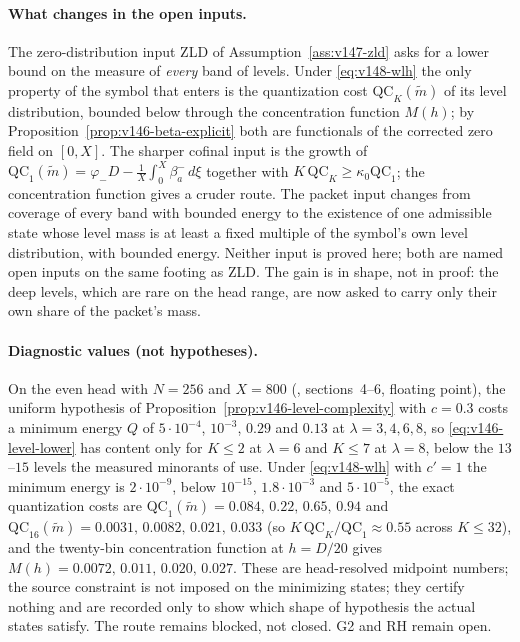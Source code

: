 \paragraph{What changes in the open inputs.}
The zero-distribution input ZLD of Assumption~\ref{ass:v147-zld} asks for
a lower bound on the measure of \emph{every} band of levels. Under
\eqref{eq:v148-wlh} the only property of the symbol that enters is the
quantization cost $\mathrm{QC}_K(\widetilde m)$ of its level distribution,
bounded below through the concentration function $M(h)$; by
Proposition~\ref{prop:v146-beta-explicit} both are functionals of the
corrected zero field on $[0,X]$. The sharper cofinal input is the growth
of $\mathrm{QC}_1(\widetilde m)=\varphi_-D-\frac1X\int_0^X\beta_a^-\,d\xi$
together with $K\,\mathrm{QC}_K\ge\kappa_0\mathrm{QC}_1$; the concentration
function gives a cruder route. The packet input changes from coverage of
every band with bounded energy to the existence of one admissible state
whose level mass is at least a fixed multiple of the symbol's own level
distribution, with bounded energy. Neither input is proved here; both are
named open inputs on the same footing as ZLD. The gain is in shape, not in
proof: the deep levels, which are rare on the head range, are now asked to
carry only their own share of the packet's mass.

\paragraph{Diagnostic values (not hypotheses).}
On the even head with $N=256$ and $X=800$
(, sections~4--6, floating point),
the uniform hypothesis of Proposition~\ref{prop:v146-level-complexity} with
$c=0.3$ costs a minimum energy $Q$ of $5\cdot10^{-4}$, $10^{-3}$, $0.29$
and $0.13$ at $\lambda=3,4,6,8$, so \eqref{eq:v146-level-lower} has content
only for $K\le2$ at $\lambda=6$ and $K\le7$ at $\lambda=8$, below the
$13$--$15$ levels the measured minorants of
 use. Under \eqref{eq:v148-wlh} with
$c'=1$ the minimum energy is $2\cdot10^{-9}$, below $10^{-15}$,
$1.8\cdot10^{-3}$ and $5\cdot10^{-5}$, the exact quantization costs are
$\mathrm{QC}_1(\widetilde m)=0.084,\,0.22,\,0.65,\,0.94$ and
$\mathrm{QC}_{16}(\widetilde m)=0.0031,\,0.0082,\,0.021,\,0.033$ (so
$K\,\mathrm{QC}_K/\mathrm{QC}_1\approx0.55$ across $K\le32$), and the
twenty-bin concentration function at $h=D/20$ gives
$M(h)=0.0072,\,0.011,\,0.020,\,0.027$. These
are head-resolved midpoint numbers; the source constraint is not imposed
on the minimizing states; they certify nothing and are recorded only to
show which shape of hypothesis the actual states satisfy. The route
remains blocked, not closed. G2 and RH remain open.
